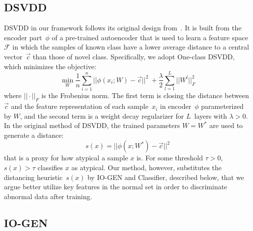 \documentclass[letterpaper]{article} %
\begin{document}
\subsection{DSVDD}
\label{sec:dsvdd}

DSVDD in our framework follows its original design
from~\citet{RVGDSBMK18}. It is built from the encoder part~$\phi$ of a
pre-trained autoencoder that is used to learn a feature
space~$\mathcal{F}$ in which the samples of known class have a lower
average distance to a central vector~$\vec{c}$ than those of novel
class. Specifically, we adopt One-class DSVDD, which minimizes the
objective:
%
\begin{equation*}
	\label{eq:dsvdd_obj}
		\min_{W} \frac{1}{n} \sum_{i=1}^{n} ||\phi(x_{i}; W) - \vec{c}||^{2} \
		+ \frac{\lambda}{2} \sum_{l=1}^{L} || W^l ||_{F}^{2}
\end{equation*}
%
where $|| \cdot ||_{F}$ is the Frobenius norm. The first term is closing
the distance between $\vec{c}$ and the feature representation of each
sample~$x_i$ in encoder~$\phi$ parameterized by $W$, and the second term
is a weight decay regularizer for $L$~layers with $\lambda > 0$. In the
original method of DSVDD, the trained parameters $W=W^*$ are used to
generate a distance:
%
\begin{equation*}
    \label{eq:dsvdd_score}
    s(x) = ||\phi(x;W^{*}) - \vec{c}||^2
\end{equation*}
%
that is a proxy for how atypical a sample $x$ is. For some threshold
$\tau > 0$, $s(x) > \tau$ classifies $x$ as atypical. Our method,
however, substitutes the distancing heuristic~$s(x)$ by \mbox{IO-GEN} and
Classifier, described below, that we argue better utilize key features
in the normal set in order to discriminate abnormal data after training.

\subsection{IO-GEN}
\label{sec:io_gen}
\end{document}
